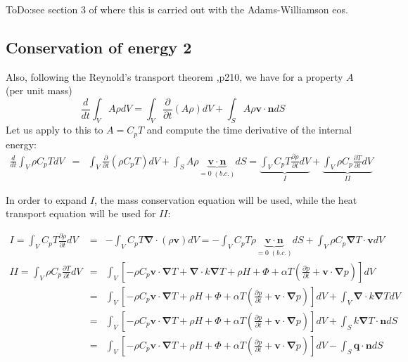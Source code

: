 {\color{red} ToDo}:see section 3 of \cite{lezh08} where this is carried out with the Adams-Williamson eos.


\subsection{Conservation of energy 2}
Also, following the Reynold's transport theorem \cite{malvern},p210, we have for a property $A$ (per unit mass)
\[
\frac{d}{dt} \int_V A \rho dV = \int_V \frac{\partial }{\partial t} (A\rho) dV + \int_S A \rho {\bm v}\cdot {\bm n} dS
\]
Let us apply to this to $A=C_p T$ and compute the time derivative of the internal energy:
\begin{eqnarray}
\frac{d}{dt} \int_V \rho C_p T dV 
&=& \int_V \frac{\partial }{\partial t} (\rho C_p T ) dV + \int_S A \rho \underbrace{{\bm v}\cdot {\bm n}}_{=0 \; (b.c.)} dS 
= \underbrace{\int_V C_p T \frac{\partial \rho}{\partial t} dV}_{I} 
+ \underbrace{\int_V \rho C_p \frac{\partial T}{\partial t}  dV }_{II}
\end{eqnarray}

In order to expand $I$, the mass conservation equation will be used, while the heat transport equation 
will be used for $II$:

\begin{eqnarray}
I= \int_V C_p T \frac{\partial \rho}{\partial t} dV
&=& 
- \int_V C_p T {\bm \nabla} \cdot (\rho {\bm v}) dV
=
-\int_V C_p T \rho \underbrace{{\bm v} \cdot {\bm n}}_{=0 \; (b.c.)} dS +  \int_V \rho C_p  {\bm \nabla}  T \cdot {\bm v} dV
\\
II=\int_V \rho C_p \frac{\partial T}{\partial t}  dV
&=&  
 \int_V \left[ -\rho C_p {\bm v}\cdot {\bm \nabla}T +{\bm \nabla}\cdot k {\bm \nabla} T + \rho H  + \Phi    +\alpha T \left( \frac{\partial p}{\partial t}+  \bm v \cdot {\bm \nabla} p \right) \right]  dV \\ 
&=& 
 \int_V \left[ -\rho C_p {\bm v}\cdot {\bm \nabla}T 
+ \rho H  + \Phi    +\alpha T \left( \frac{\partial p}{\partial t}+  \bm v \cdot {\bm \nabla} p \right) \right]  dV 
+ \int_V {\bm \nabla}\cdot k {\bm \nabla} T dV \\ 
&=& 
 \int_V \left[ -\rho C_p {\bm v}\cdot {\bm \nabla}T 
+ \rho H  + \Phi    +\alpha T \left( \frac{\partial p}{\partial t}+  \bm v \cdot {\bm \nabla} p \right) \right]  dV 
+ \int_S  k {\bm \nabla} T \cdot {\bm n}  dS \\ 
&=& 
 \int_V \left[ -\rho C_p {\bm v}\cdot {\bm \nabla}T 
+ \rho H  + \Phi    +\alpha T \left( \frac{\partial p}{\partial t}+  \bm v \cdot {\bm \nabla} p \right) \right]  dV 
- \int_S  {\bm q} \cdot {\bm n}  dS \label{ba004}
\end{eqnarray}

